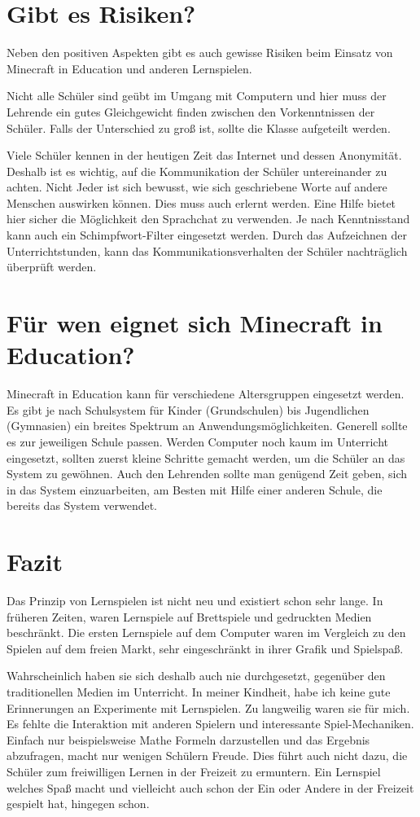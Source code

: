 \section{Gibt es Risiken?}

Neben den positiven Aspekten gibt es auch gewisse Risiken beim Einsatz von Minecraft in Education und anderen Lernspielen.

Nicht alle Schüler sind geübt im Umgang mit Computern und hier muss der Lehrende ein gutes Gleichgewicht finden zwischen den Vorkenntnissen der Schüler. Falls der Unterschied zu groß ist, sollte die Klasse aufgeteilt werden.

Viele Schüler kennen in der heutigen Zeit das Internet und dessen Anonymität. Deshalb ist es wichtig, auf die Kommunikation der Schüler untereinander zu achten. Nicht Jeder ist sich bewusst, wie sich geschriebene Worte auf andere Menschen auswirken können. Dies muss auch erlernt werden. Eine Hilfe bietet hier sicher die Möglichkeit den Sprachchat zu verwenden. Je nach Kenntnisstand kann auch ein Schimpfwort-Filter eingesetzt werden. Durch das Aufzeichnen der Unterrichtstunden, kann das Kommunikationsverhalten der Schüler nachträglich überprüft werden.

\section{Für wen eignet sich Minecraft in Education?}
Minecraft in Education kann für verschiedene Altersgruppen eingesetzt werden. Es gibt je nach Schulsystem für Kinder (Grundschulen) bis Jugendlichen (Gymnasien) ein breites Spektrum an Anwendungsmöglichkeiten. Generell sollte es zur jeweiligen Schule passen. Werden Computer noch kaum im Unterricht eingesetzt, sollten zuerst kleine Schritte gemacht werden, um die Schüler an das System zu gewöhnen.
Auch den Lehrenden sollte man genügend Zeit geben, sich in das System einzuarbeiten, am Besten mit Hilfe einer anderen Schule, die bereits das System verwendet.

\section{Fazit}
Das Prinzip von Lernspielen ist nicht neu und existiert schon sehr lange. In früheren Zeiten, waren Lernspiele auf Brettspiele und gedruckten Medien beschränkt. Die ersten Lernspiele auf dem Computer waren im Vergleich zu den Spielen auf dem freien Markt, sehr eingeschränkt in ihrer Grafik und Spielspaß. 

Wahrscheinlich haben sie sich deshalb auch nie durchgesetzt, gegenüber den traditionellen Medien im Unterricht.
In meiner Kindheit, habe ich keine gute Erinnerungen an Experimente mit Lernspielen. Zu langweilig waren sie für mich. Es fehlte die Interaktion mit anderen Spielern und interessante Spiel-Mechaniken. Einfach nur beispielsweise Mathe Formeln darzustellen und das Ergebnis abzufragen, macht nur wenigen Schülern Freude. Dies führt auch nicht dazu, die Schüler zum freiwilligen Lernen in der Freizeit zu ermuntern. Ein Lernspiel welches Spaß macht und vielleicht auch schon der Ein oder Andere in der Freizeit gespielt hat, hingegen schon.

